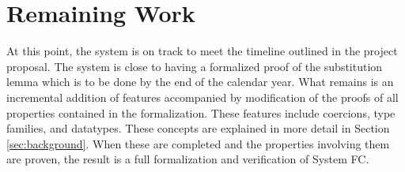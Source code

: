 \documentclass{sig-alternate}
\begin{document}
\section{Remaining Work}
\label{sec:remaining}
At this point, the system is on track to meet the timeline outlined in the project proposal. The system is close to having a formalized proof of the substitution lemma which is to be done by the end of the calendar year. What remains is an incremental addition of features accompanied by modification of the proofs of all properties contained in the formalization. These features include coercions, type families, and datatypes. These concepts are explained in more detail in Section \ref{sec:background}. When these are completed and the properties involving them are proven, the result is a full formalization and verification of System FC.


\vspace{175pt}
\end{document}
